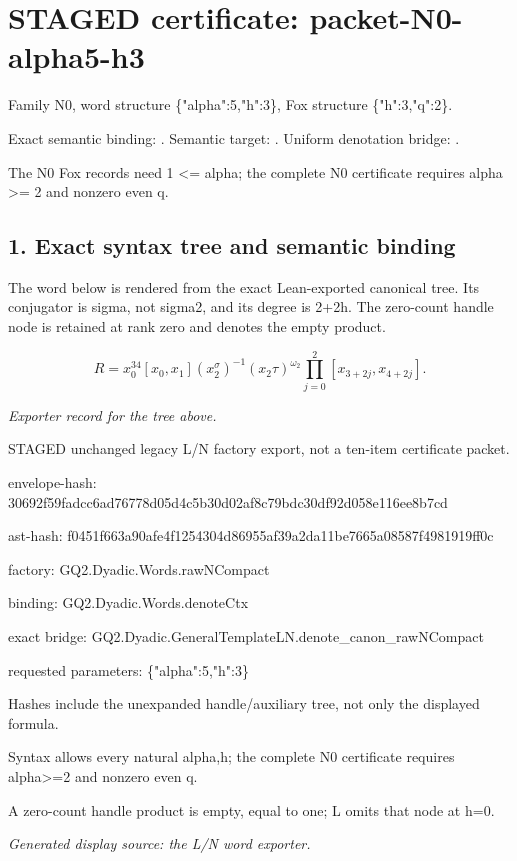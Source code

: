 \section*{STAGED certificate: packet-N0-alpha5-h3}
Family N0, word structure \{"alpha":5,"h":3\}, Fox structure \{"h":3,"q":2\}.

\noindent Exact semantic binding: . Semantic target: . Uniform denotation bridge: .
\par\noindent The N0 Fox records need 1 <= alpha; the complete N0 certificate requires alpha >= 2 and nonzero even q.

\subsection*{1. Exact syntax tree and semantic binding}
The word below is rendered from the exact Lean-exported canonical tree. Its conjugator is sigma, not sigma2, and its degree is 2+2h. The zero-count handle node is retained at rank zero and denotes the empty product.

\[R=x_0^{34}[x_0,x_1](x_2^\sigma)^{-1}(x_2\tau)^{\omega_2}\prod_{j=0}^2[x_{3+2j},x_{4+2j}].\]
\par\noindent\emph{Exporter record for the tree above.}
\par\noindent STAGED unchanged legacy L/N factory export, not a ten-item certificate packet.
\par\noindent envelope-hash: 30692f59fadcc6ad76778d05d4c5b30d02af8c79bdc30df92d058e116ee8b7cd
\par\noindent ast-hash: f0451f663a90afe4f1254304d86955af39a2da11be7665a08587f4981919ff0c
\par\noindent factory: GQ2.Dyadic.Words.rawNCompact
\par\noindent binding: GQ2.Dyadic.Words.denoteCtx
\par\noindent exact bridge: GQ2.Dyadic.GeneralTemplateLN.denote\_canon\_rawNCompact
\par\noindent requested parameters: \{"alpha":5,"h":3\}
\par\noindent Hashes include the unexpanded handle/auxiliary tree, not only the displayed formula.
\par\noindent Syntax allows every natural alpha,h; the complete N0 certificate requires alpha>=2 and nonzero even q.
\par\noindent A zero-count handle product is empty, equal to one; L omits that node at h=0.
\par\noindent\emph{Generated display source: the L/N word exporter.}
